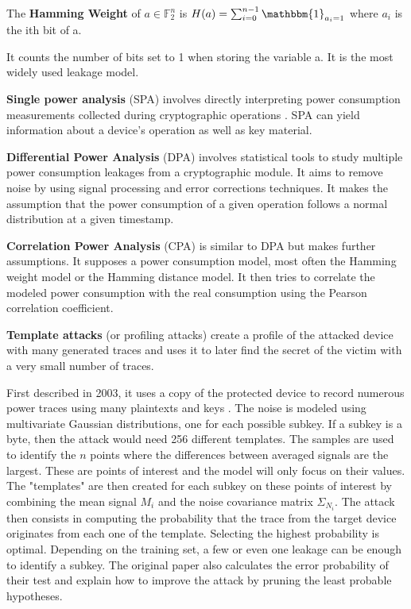 \documentclass[11pt]{sdm}
\begin{document}
The \textbf{Hamming Weight} of $a \in \mathbb{F}_2^n$ is $H(a) = \sum_{i=0}^{n-1} \mathbbm{1}_{a_i = 1}$ where $a_i$ is the ith bit of a.

It counts the number of bits set to 1 when storing the variable a.
It is the most widely used leakage model.

\textbf{Single power analysis} (SPA) involves directly interpreting power consumption measurements collected during cryptographic operations \parencite{Kocher_Jaffe_Jun_1999}.
SPA can yield information about a device's operation as well as key material.

\textbf{Differential Power Analysis} (DPA) involves statistical tools to study multiple power consumption leakages from a cryptographic module.
It aims to remove noise by using signal processing and error corrections techniques.
It makes the assumption that the power consumption of a given operation follows a normal distribution at a given timestamp. 

\textbf{Correlation Power Analysis} (CPA) is similar to DPA but makes further assumptions.
It supposes a power consumption model, most often the Hamming weight model or the Hamming distance model.
It then tries to correlate the modeled power consumption with the real consumption using the Pearson correlation coefficient. %

\textbf{Template attacks} (or profiling attacks) create a profile of the attacked device with many generated traces and uses it to later find the secret of the victim with a very small number of traces.

First described in 2003, it uses a copy of the protected device to record numerous power traces using many plaintexts and keys \parencite{Chari_Rao_Rohatgi_2003}.
The noise is modeled using multivariate Gaussian distributions, one for each possible subkey.
If a subkey is a byte, then the attack would need 256 different templates.
The samples are used to identify the $n$ points where the differences between averaged signals are the largest.
These are points of interest and the model will only focus on their values.
The "templates" are then created for each subkey on these points of interest by combining the mean signal $M_i$ and the noise covariance matrix $\Sigma_{N_i}$.
The attack then consists in computing the probability that the trace from the target device originates from each one of the template.
Selecting the highest probability is optimal.
Depending on the training set, a few or even one leakage can be enough to identify a subkey.
The original paper also calculates the error probability of their test and explain how to improve the attack by pruning the least probable hypotheses.
\end{document}

